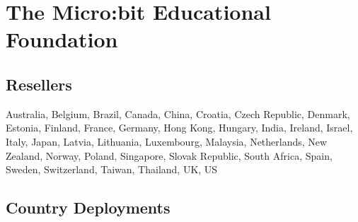 \section{The Micro:bit Educational Foundation}
\label{sec:mef}





\subsection{Resellers}

Australia, Belgium, Brazil, Canada, China, Croatia, Czech Republic, 
Denmark, Estonia, Finland, France, Germany, Hong Kong, Hungary, India, 
Ireland, Israel, Italy, Japan, Latvia, Lithuania, Luxembourg, Malaysia, 
Netherlands, New Zealand, Norway, Poland, Singapore, Slovak Republic, 
South Africa, Spain, Sweden, Switzerland, Taiwan, Thailand, UK, US

\subsection{Country Deployments}